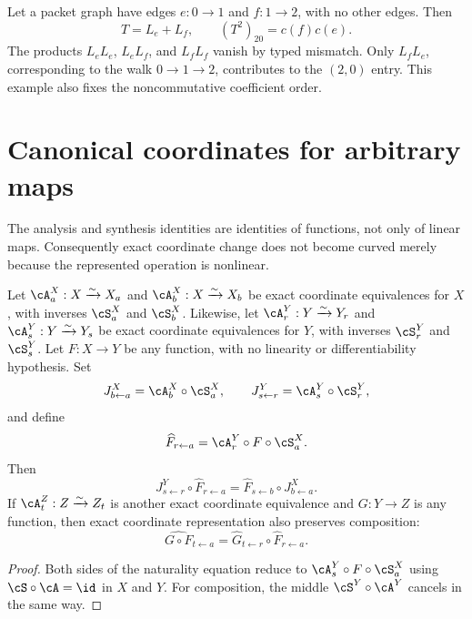 \begin{example}
Let a packet graph have edges $e:0\to1$ and $f:1\to2$, with no other edges.
Then
\[
T=L_e+L_f,\qquad
(T^2)_{20}=c(f)c(e).
\]
The products $L_eL_e$, $L_eL_f$, and $L_fL_f$ vanish by typed mismatch.
Only $L_fL_e$, corresponding to the walk $0\to1\to2$, contributes to the
$(2,0)$ entry.  This example also fixes the noncommutative coefficient order.
\end{example}

\section{Canonical coordinates for arbitrary maps}
\label{sec:arbitrary-maps}

The analysis and synthesis identities are identities of functions, not only
of linear maps.  Consequently exact coordinate change does not become
curved merely because the represented operation is nonlinear.

\begin{proposition}
\label{prop:set-naturality}
Let $\cA^X_a:X\xrightarrow{\sim}X_a$ and
$\cA^X_b:X\xrightarrow{\sim}X_b$ be exact coordinate equivalences for $X$,
with inverses $\cS^X_a$ and $\cS^X_b$.  Likewise, let
$\cA^Y_r:Y\xrightarrow{\sim}Y_r$ and
$\cA^Y_s:Y\xrightarrow{\sim}Y_s$ be exact coordinate equivalences for $Y$,
with inverses $\cS^Y_r$ and $\cS^Y_s$.  Let $F:X\to Y$ be any function, with
no linearity or differentiability hypothesis.  Set
\[
J^X_{b\leftarrow a}=\cA^X_b\circ\cS^X_a,
\qquad
J^Y_{s\leftarrow r}=\cA^Y_s\circ\cS^Y_r,
\]
and define
\[
\widehat F_{r\leftarrow a}
=
\cA^Y_r\circ F\circ\cS^X_a.
\]
Then
\[
J^Y_{s\leftarrow r}\circ\widehat F_{r\leftarrow a}
=
\widehat F_{s\leftarrow b}\circ J^X_{b\leftarrow a}.
\]
If $\cA^Z_t:Z\xrightarrow{\sim}Z_t$ is another exact coordinate equivalence
and $G:Y\to Z$ is any function, then exact coordinate representation also
preserves composition:
\[
\widehat{G\circ F}_{t\leftarrow a}
=
\widehat G_{t\leftarrow r}\circ\widehat F_{r\leftarrow a}.
\]
\end{proposition}

\begin{proof}
Both sides of the naturality equation reduce to
$\cA^Y_s\circ F\circ\cS^X_a$ using
$\cS\circ\cA=\id$ in $X$ and $Y$.  For composition, the middle
$\cS^Y\circ\cA^Y$ cancels in the same way.
\end{proof}

